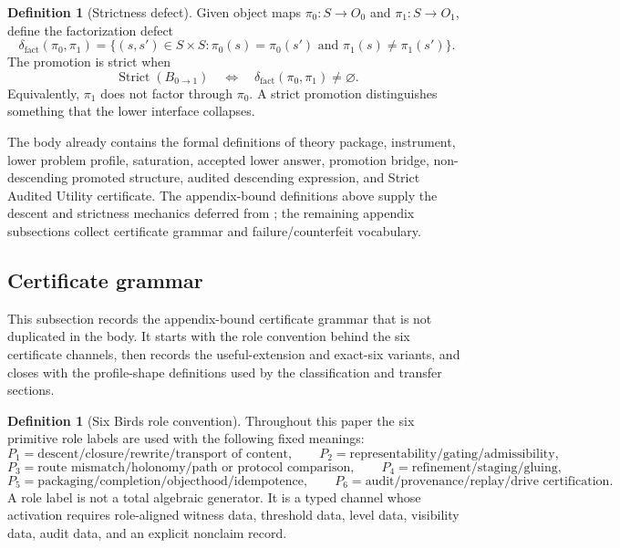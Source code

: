 \documentclass[11pt]{article}
\theoremstyle{definition}
\newtheorem{definition}[theorem]{Definition}
\begin{document}
\begin{definition}[Strictness defect]
\label{def:sau-strictness-defect}
Given object maps \(\pi_0:S\to O_0\) and \(\pi_1:S\to O_1\), define the factorization defect
\[
\delta_{\mathrm{fact}}(\pi_0,\pi_1)
=
\{(s,s')\in S\times S:\pi_0(s)=\pi_0(s')\text{ and }\pi_1(s)\neq\pi_1(s')\}.
\]
The promotion is strict when
\[
\operatorname{Strict}(B_{0\to1})
\quad\Longleftrightarrow\quad
\delta_{\mathrm{fact}}(\pi_0,\pi_1)\neq\varnothing.
\]
Equivalently, \(\pi_1\) does not factor through \(\pi_0\). A strict promotion distinguishes something that the lower interface collapses.
\end{definition}

The body already contains the formal definitions of theory package, instrument,
lower problem profile, saturation, accepted lower answer, promotion bridge,
non-descending promoted structure, audited descending expression, and Strict
Audited Utility certificate.  The appendix-bound definitions above supply the
descent and strictness mechanics deferred from ; the remaining
appendix subsections collect certificate grammar and failure/counterfeit
vocabulary.

\subsection{Certificate grammar}
\label{appsubsec:definitions-certificate-grammar}

This subsection records the appendix-bound certificate grammar that is not
duplicated in the body.  It starts with the role convention behind the six
certificate channels, then records the useful-extension and exact-six variants,
and closes with the profile-shape definitions used by the classification and
transfer sections.

\begin{definition}[Six Birds role convention]
\label{def:sau-roles}
Throughout this paper the six primitive role labels are used with the following fixed meanings:
\[
P_1=\text{descent/closure/rewrite/transport of content},\qquad
P_2=\text{representability/gating/admissibility},
\]
\[
P_3=\text{route mismatch/holonomy/path or protocol comparison},\qquad
P_4=\text{refinement/staging/gluing},
\]
\[
P_5=\text{packaging/completion/objecthood/idempotence},\qquad
P_6=\text{audit/provenance/replay/drive certification}.
\]
A role label is not a total algebraic generator. It is a typed channel whose activation requires role-aligned witness data, threshold data, level data, visibility data, audit data, and an explicit nonclaim record.
\end{definition}
\end{document}
